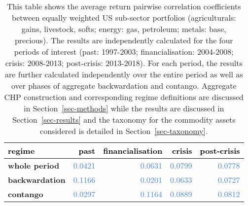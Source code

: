 \documentclass[
  authoryear,
  preprint,
  3p]{elsarticle}
\begin{document}
\begin{longtable}[t]{>{}l>{}r>{}r>{}r>{}r}

\caption{\label{tbl-correlations-cross-periods}This table shows the
average return pairwise correlation coefficients between equally
weighted US sub-sector portfolios (agriculturals: gains, livestock,
softs; energy: gas, petroleum; metals: base, precious). The results are
independently calculated for the four periods of interest (past:
1997-2003; financialisation: 2004-2008; crisis: 2008-2013; post-crisis:
2013-2018). For each period, the results are further calculated
independently over the entire period as well as over phases of aggregate
backwardation and contango. Aggregate CHP construction and corresponding
regime definitions are discussed in Section~\ref{sec-methods} while the
results are discussed in Section~\ref{sec-results} and the taxonomy for
the commodity assets considered is detailed in
Section~\ref{sec-taxonomy}.}

\tabularnewline

\toprule
\textcolor{black}{\textbf{regime}} & \textcolor{black}{\textbf{past}} & \textcolor{black}{\textbf{financialisation}} & \textcolor{black}{\textbf{crisis}} & \textcolor{black}{\textbf{post-crisis}}\\
\midrule
\textbf{whole period} & \textcolor[HTML]{4285f4}{0.0421} & \textcolor[HTML]{4285f4}{0.0631} & \textcolor[HTML]{4285f4}{0.0799} & \textcolor[HTML]{4285f4}{0.0778}\\
\textbf{backwardation} & \textcolor[HTML]{4285f4}{0.1166} & \textcolor[HTML]{4285f4}{0.0201} & \textcolor[HTML]{4285f4}{0.0633} & \textcolor[HTML]{4285f4}{0.0727}\\
\textbf{contango} & \textcolor[HTML]{4285f4}{0.0297} & \textcolor[HTML]{4285f4}{0.1164} & \textcolor[HTML]{4285f4}{0.0889} & \textcolor[HTML]{4285f4}{0.0812}\\
\bottomrule

\end{longtable}

\endgroup{}

\newpage
\end{document}
